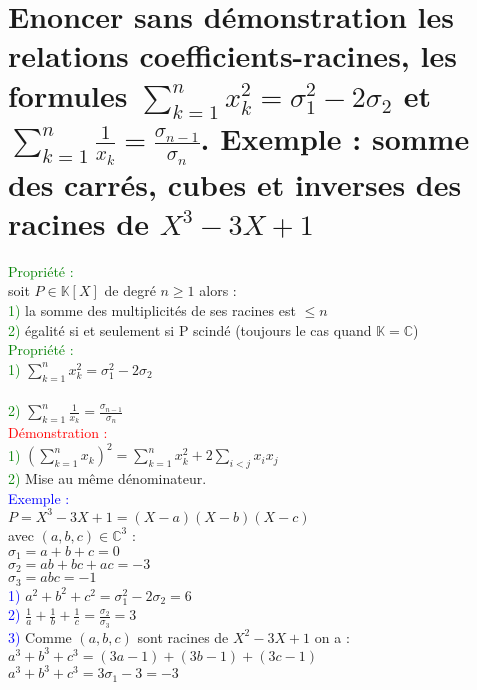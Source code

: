 \documentclass{article}
\begin{document}
\section{Enoncer sans démonstration les relations coefficients-racines, les formules $\sum_{k=1}^n x_k^2= \sigma_1^2-2 \sigma_2$ et $\sum_{k=1}^n \frac{1}{x_k}=\frac{\sigma_{n-1}}{\sigma_{n}}$. Exemple : somme des carrés, cubes et inverses des racines de $X^3-3X+1$}
\textcolor{green}{Propriété :} \\
soit $P \in \mathbb K [X]$ de degré $n \geq 1$ alors : \\
\textcolor{green}{1)} la somme des multiplicités de ses racines est $\leq n$ \\
\textcolor{green}{2)} égalité si et seulement si P scindé (toujours le cas quand $\mathbb K = \mathbb C$) \\
\textcolor{green}{Propriété :} \\
\textcolor{green}{1)} $\sum_{k=1}^n x_k^2= \sigma_1^2-2 \sigma_2$ \\ \\
\textcolor{green}{2)} $\sum_{k=1}^n \frac{1}{x_k}=\frac{\sigma_{n-1}}{\sigma_{n}}$ \\
\textcolor{red}{Démonstration :} \\
\textcolor{green}{1)} $(\sum_{k=1}^n x_k)^2= \sum_{k=1}^n x_k^2+ 2 \sum_{i<j}x_ix_j$ \\
\textcolor{green}{2)} Mise au même dénominateur. \\
\textcolor{blue}{Exemple :} \\
$P=X^3-3X+1=(X-a)(X-b)(X-c)$ \\
avec $(a,b,c) \in \mathbb C^3$ : \\
$\sigma_1=a+b+c=0$ \\
$\sigma_2=ab+bc+ac=-3$ \\
$\sigma_3=abc=-1$ \\
\textcolor{blue}{1)} $a^2+b^2+c^2= \sigma_1^2-2\sigma_2=6$ \\
\textcolor{blue}{2)} $\frac{1}{a}+ \frac{1}{b} + \frac{1}{c}= \frac{\sigma_2}{\sigma_3}=3$ \\
\textcolor{blue}{3)} Comme $(a,b,c)$ sont racines de $X^2-3X+1$ on a : \\
$a^3+b^3+c^3=(3a-1)+(3b-1)+(3c-1)$ \\
$a^3+b^3+c^3=3 \sigma_1 -3 =-3$
\end{document}
